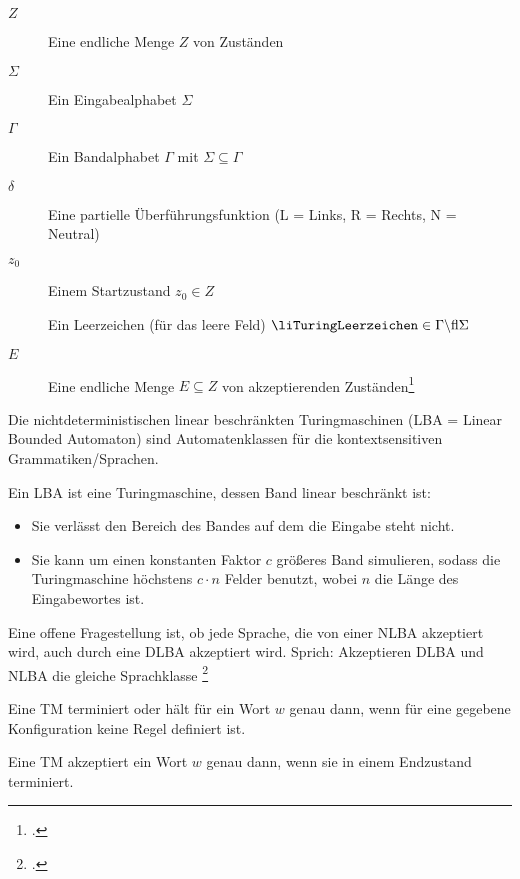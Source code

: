 \documentclass{bschlangaul-theorie}
\begin{document}
\begin{description}
\item[$Z$]
Eine endliche Menge $Z$ von Zuständen

\item[$\Sigma$]
Ein Eingabealphabet $\Sigma$

\item[$\Gamma$]
Ein Bandalphabet $\Gamma$ mit $\Sigma \subseteq\Gamma$

\item[$\delta$]
Eine partielle Überführungsfunktion
\liTuringUeberfuehrung (L = Links, R = Rechts, N = Neutral)

\item[$z_0$]
Einem Startzustand $z_0 \in Z$

\item[\liTuringLeerzeichen]
Ein Leerzeichen (für das leere Feld) $\liTuringLeerzeichen \in \Gamma \string\ \Sigma$

\item[$E$]
Eine endliche Menge $E \subseteq Z$ von
akzeptierenden Zuständen\footcite[Seite 21]{theo:fs:3}
\end{description}

Die nichtdeterministischen linear beschränkten Turingmaschinen
(LBA = Linear Bounded Automaton) sind Automatenklassen für die
kontextsensitiven Grammatiken/Sprachen.

Ein LBA ist eine Turingmaschine, dessen Band linear beschränkt ist:

\begin{itemize}
\item[Definition 1]

Sie verlässt den Bereich des Bandes auf dem die Eingabe steht nicht.

\item[Definition 2]

Sie kann um einen konstanten Faktor $c$ größeres Band simulieren, sodass
die Turingmaschine höchstens $c \cdot n$ Felder benutzt, wobei $n$ die
Länge des Eingabewortes ist.
\end{itemize}

Eine offene Fragestellung ist, ob jede Sprache, die von einer NLBA
akzeptiert wird, auch durch eine DLBA akzeptiert wird. Sprich:
Akzeptieren DLBA und NLBA die gleiche Sprachklasse
\footcite[Seite 10]{theo:fs:3}

Eine TM terminiert oder hält für ein Wort $w$ genau dann, wenn für
eine gegebene Konfiguration keine Regel definiert ist.

Eine TM akzeptiert ein Wort $w$ genau dann, wenn sie in einem
Endzustand terminiert.
\end{document}

